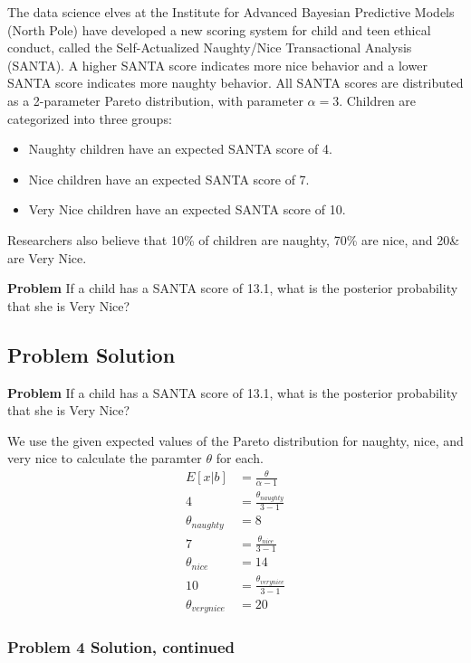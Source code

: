 \documentclass[12pt]{article}
\theoremstyle{definition}
\begin{document}
The data science elves at the Institute for Advanced Bayesian Predictive Models (North Pole) have developed a new scoring system for child and teen ethical conduct, called the Self-Actualized Naughty/Nice Transactional Analysis (SANTA). A higher SANTA score indicates more nice behavior and a lower SANTA score indicates more naughty behavior. All SANTA scores are distributed as a 2-parameter Pareto distribution, with parameter $\alpha = 3$. Children are categorized into three groups:
\begin{itemize}
	\item Naughty children have an expected SANTA score of 4.
	\item Nice children have an expected SANTA score of 7.
	\item Very Nice children have an expected SANTA score of 10.
\end{itemize}
Researchers also believe that 10\% of children are naughty, 70\% are nice, and 20\& are Very Nice.

\bigskip
\noindent
{\bf Problem} If a child has a SANTA score of 13.1, what is the posterior probability that she is Very Nice?




\subsection*{Problem Solution}

\noindent
{\bf Problem} If a child has a SANTA score of 13.1, what is the posterior probability that she is Very Nice?

We use the given expected values of the Pareto distribution for naughty, nice, and very nice to calculate the paramter $\theta$ for each.
\begin{align*}
E[x|b] &= \frac{\theta}{\alpha - 1}\\
4 &= \frac{\theta_{naughty}}{3 - 1}\\
\theta_{naughty} &= 8\\
7 &= \frac{\theta_{nice}}{3 - 1}\\
\theta_{nice} &= 14\\
10 &= \frac{\theta_{very nice}}{3 - 1}\\
\theta_{very nice} &= 20
\end{align*}

\newpage
\subsubsection*{Problem 4 Solution, continued}
\end{document}
